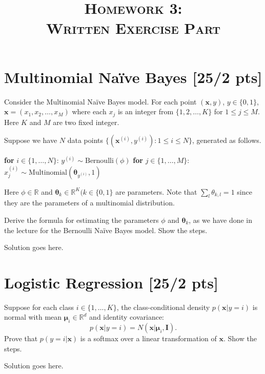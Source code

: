 \documentclass[a4paper]{article}
\title{\textsc{Homework 3: \\ Written Exercise Part}} %
\date{}
\theoremstyle{definition}
\newenvironment{soln}{
    \leavevmode\color{blue}\ignorespaces
}{}
\begin{document}
\maketitle 


\section{Multinomial Na\"ive Bayes [25/2 pts]}
Consider the Multinomial Na\"ive Bayes model. For each point $(\mathbf{x}, y)$, $y \in \{0, 1\}$, $\mathbf{x} = (x_1, x_2, \ldots, x_M)$ where each $x_j$ is an integer from $\{1, 2, \ldots, K\}$ for $1\le j \le M$. Here $K$ and $M$ are two fixed integer. 

Suppose we have $N$ data points $\{(\mathbf{x}^{(i)}, y^{(i)}): 1 \le i \le N\}$, generated as follows.
\begin{algorithmic}
\STATE \textbf{for} $i \in \{1, \ldots, N\}$: 
\STATE \quad $y^{(i)} \sim \text{Bernoulli}(\phi)$
\STATE \quad \textbf{for} $j \in \{1, \ldots, M\}$:
\STATE \quad \quad $x_j^{(i)} \sim \text{Multinomial}(\mathbf{\theta}_{y^{(i)}}, 1)$
\end{algorithmic}
Here $\phi \in \mathbb{R}$ and $\mathbf{\theta}_k \in \mathbb{R}^{K} (k \in \{0,1\}$ are parameters. Note that $\sum_l \theta_{k, l} = 1$ since they are the parameters of a multinomial distribution.

Derive the formula for estimating the parameters $\phi$ and $\mathbf{\theta}_k$, as we have done in the lecture for the Bernoulli Na\"ive Bayes model. Show the steps.

\begin{soln}  Solution goes here. \end{soln}


\section{Logistic Regression [25/2 pts]}
Suppose for each class $i \in \{1,\ldots, K\}$, the class-conditional density $p(\mathbf{x}| y = i)$ is normal with mean $\mathbf{\mu}_i \in \mathbb{R}^d$ and identity covariance: 
\[
  p(\mathbf{x} | y=i) = N(\mathbf{x}| \mathbf{\mu}_i, \mathbf{I}).
\]
Prove that $p(y=i|\mathbf{x})$ is a softmax over a linear transformation of $\mathbf{x}$. Show the steps.

\begin{soln}  Solution goes here. \end{soln}





\end{document}
